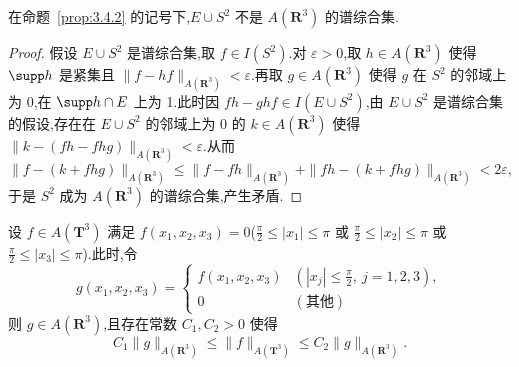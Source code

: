 \begin{proposition}\label{prop:3.4.3}
在命题~\ref{prop:3.4.2} 的记号下,$E \cup S^{2}$ 不是 $A(\mathbf{R}^{3})$ 的谱综合集.
\end{proposition}

\begin{proof}
假设 $E \cup S^{2}$ 是谱综合集,取 $f \in I(S^{2})$.对 $\varepsilon > 0$,取 $h \in A(\mathbf{R}^{3})$ 使得 $\supp h$ 是紧集且 $\|f - hf\|_{A(\mathbf{R}^{3})} < \varepsilon$.再取 $g \in A(\mathbf{R}^{3})$ 使得 $g$ 在 $S^{2}$ 的邻域上为 0,在 $\supp h \cap E$ 上为 1.此时因 $fh - ghf \in I(E \cup S^{2})$,由 $E \cup S^{2}$ 是谱综合集的假设,存在在 $E \cup S^{2}$ 的邻域上为 0 的 $k \in A(\mathbf{R}^{3})$ 使得 $\|k - (fh - fhg)\|_{A(\mathbf{R}^{3})} < \varepsilon$.从而
\begin{equation*}
\|f - (k + fhg)\|_{A(\mathbf{R}^{3})} \leq \|f - fh\|_{A(\mathbf{R}^{3})} + \|fh - (k + fhg)\|_{A(\mathbf{R}^{3})} < 2\varepsilon,
\end{equation*}
于是 $S^{2}$ 成为 $A(\mathbf{R}^{3})$ 的谱综合集,产生矛盾.
\end{proof}

\begin{proposition}\label{prop:3.4.4}
设 $f \in A(\mathbf{T}^{3})$ 满足 $f(x_{1}, x_{2}, x_{3}) = 0$($\frac{\pi}{2} \leq |x_{1}| \leq \pi$ 或 $\frac{\pi}{2} \leq |x_{2}| \leq \pi$ 或 $\frac{\pi}{2} \leq |x_{3}| \leq \pi$).此时,令
\begin{equation*}
g(x_{1}, x_{2}, x_{3}) = \left\{\begin{array}{ll}
f(x_{1}, x_{2}, x_{3}) & (|x_{j}| \leq \frac{\pi}{2},\ j = 1, 2, 3),\\
0 & (\text{其他})
\end{array}\right.
\end{equation*}
则 $g \in A(\mathbf{R}^{3})$,且存在常数 $C_{1}, C_{2} > 0$ 使得
\begin{equation*}
C_{1}\|g\|_{A(\mathbf{R}^{3})} \leq \|f\|_{A(\mathbf{T}^{3})} \leq C_{2}\|g\|_{A(\mathbf{R}^{3})}.
\end{equation*}
\end{proposition}

